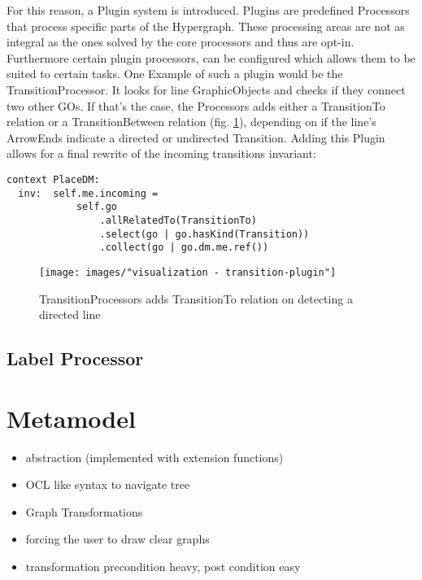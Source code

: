 For this reason, a Plugin system is introduced. Plugins are predefined Processors that process specific parts of the Hypergraph. These processing areas are not as integral as the ones solved by the core processors and thus are opt-in. Furthermore certain plugin processors, can be configured which allows them to be suited to certain tasks. One Example of such a plugin would be the TransitionProcessor. It looks for line GraphicObjects and checks if they connect two other GOs. If that's the case, the Processors adds either a TransitionTo relation or a TransitionBetween relation (fig. \ref{fig:transition-plugin}), depending on if the line's ArrowEnds indicate a directed or undirected Transition. Adding this Plugin allows for a final rewrite of the incoming transitions invariant:

\begin{lstlisting}[language=OCL]
  context PlaceDM: 
  inv:  self.me.incoming = 
            self.go
                .allRelatedTo(TransitionTo)
                .select(go | go.hasKind(Transition))
                .collect(go | go.dm.me.ref())
\end{lstlisting}

\begin{figure}
\centering
\texttt{[image: images/"visualization - transition-plugin"]}
\caption{TransitionProcessors adds TransitionTo relation on detecting a directed line}
\label{fig:transition-plugin}
\end{figure}

\subsection{Label Processor}




\section{Metamodel}


   


\begin{itemize}
  \item abstraction (implemented with extension functions)
  \item OCL like syntax to navigate tree
  \item Graph Transformations 
  \item forcing the user to draw clear graphs
  \item transformation precondition heavy, post condition easy
\end{itemize}